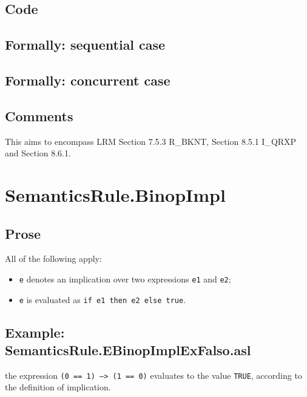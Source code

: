 \documentclass{book}
\begin{document}
  \subsection{Code}

\begin{emptyformal}
  \subsection{Formally: sequential case}

  \subsection{Formally: concurrent case}
\end{emptyformal}

  \subsection{Comments}
  This aims to encompass LRM Section 7.5.3 R\_BKNT, Section 8.5.1 I\_QRXP and Section
  8.6.1.

\section{SemanticsRule.BinopImpl \label{sec:SemanticsRule.BinopImpl}}

  \subsection{Prose}
  All of the following apply:
  \begin{itemize}
  \item \texttt{e} denotes an implication over two expressions \texttt{e1} and \texttt{e2};
  \item \texttt{e} is evaluated as \texttt{if e1 then e2 else true}.
  \end{itemize}

  \subsection{Example: SemanticsRule.EBinopImplExFalso.asl}
the expression \texttt{(0 == 1) --> (1 == 0)} evaluates to the value \texttt{TRUE}, according to the definition of implication.
\end{document}
